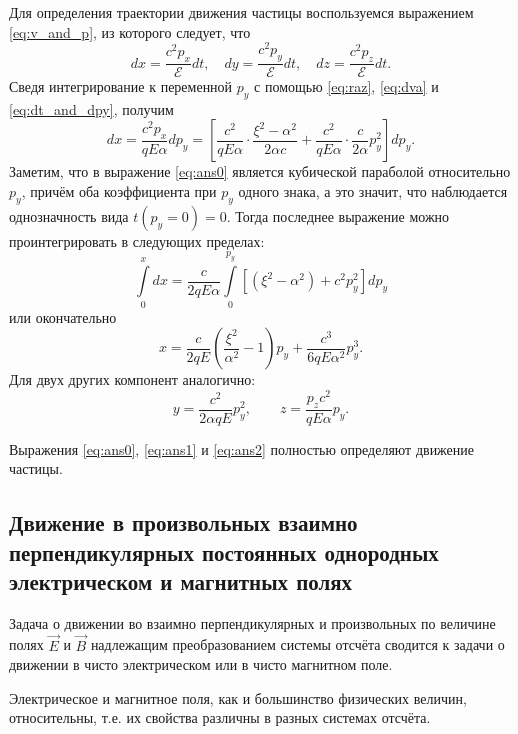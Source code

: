 Для определения траектории движения частицы воспользуемся выражением \eqref{eq:v_and_p}, из которого следует, что
\begin{equation}
 dx = \frac{c^2 p_x}{\mathscr{E}} dt, \quad  dy =  \frac{c^2 p_y}{\mathscr{E}} dt, \quad  dz = \frac{c^2 p_z}{\mathscr{E}} dt.
\end{equation}
Сведя интегрирование к переменной $p_y$ с помощью \eqref{eq:raz}, \eqref{eq:dva} и \eqref{eq:dt_and_dpy}, получим 
\begin{equation*}
dx =  \frac{c^2 p_x}{ qE\alpha }  dp_y = \left[ \frac{c^2}{ qE\alpha } \cdot \frac{\xi^2 - \alpha^2}{2 \alpha c} +  \frac{c^2}{ qE\alpha } \cdot \frac{c}{2 \alpha} p_y^2  \right] d p_y.
\end{equation*}
Заметим, что в выражение \eqref{eq:ans0} является кубической параболой относительно $p_y$, причём оба коэффициента при  $p_y$ одного знака, а это значит, что наблюдается однозначность вида $t (p_y = 0) = 0$. Тогда последнее выражение можно проинтегрировать в следующих пределах:
\begin{equation*}
\int \limits_0^x dx =  \frac{c}{2 q E \alpha}  \int \limits_0^{p_y} \left[ \left(  \xi^2 - \alpha^2  \right) + c^2 p_y^2 \right] dp_y
\end{equation*}
или окончательно
\begin{equation}
x = \frac{c}{2qE} \left( \frac{\xi^2}{\alpha^2}  - 1  \right) p_y + \frac{c^3}{6qE \alpha^2} p_y^3.
\label{eq:ans1}
\end{equation}
Для двух других компонент аналогично:
\begin{equation}
 y = \frac{c^2}{2 \alpha q E} p_y^2, \qquad z = \frac{p_z c^2}{qE \alpha} p_y.
 \label{eq:ans2}
\end{equation}

Выражения \eqref{eq:ans0}, \eqref{eq:ans1} и \eqref{eq:ans2} полностью определяют  движение частицы.


\subsection{Движение в произвольных взаимно перпендикулярных постоянных однородных электрическом и магнитных полях}

Задача о движении во взаимно перпендикулярных и произвольных по величине полях $\vec{E}$ и $\vec{B}$ надлежащим преобразованием системы отсчёта сводится к задачи о движении в чисто электрическом или в чисто магнитном поле.

Электрическое и магнитное поля, как и большинство физических величин, относительны, т.е. их свойства различны в разных системах отсчёта. 

